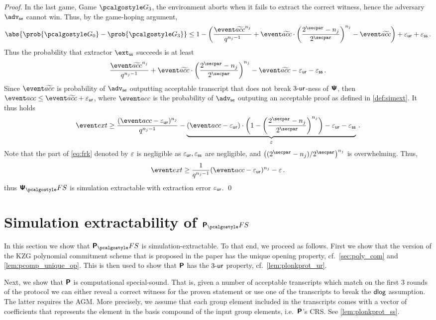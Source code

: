 \let\accentvec\vec \documentclass[runningheads,10pt]{llncs}
\begin{document}
\begin{proof}
	In the last game, Game $\game{3}$, the environment aborts when it fails to
	extract the correct witness, hence the adversary $\advse$ cannot win.  Thus,
	by the game-hoping argument, 
	\[
		\abs{\prob{\game{0}} - \prob{\game{3}}} \leq 1 -
		\left(\frac{\waccProb^{n_j}}{q^{n_j - 1}} + \waccProb \cdot
		\left(\frac{2^\secpar - n_j}{2^\secpar}\right)^{n_j} - \waccProb\right) + \epsur + \epsss\,.
	\]
	Thus the probability that extractor $\extss$ succeeds is at least
	\[
		\frac{\waccProb^{n_j}}{q^{n_j - 1}} + 
		\waccProb \cdot
		\left( \frac{2^\secpar - n_j}{2^\secpar}\right)^{n_j} -
	\waccProb - \epsur - \epsss\,.
	\]
	Since $\waccProb$ is probability of $\advse$ outputting acceptable
	transcript that does not break ${3\text{-}\mathsf{ur}}$-ness of $\bm{\mathsf{\Psi}}$, then $\accProb \leq
	\waccProb + \epsur$, where $\accProb$ is the probability of $\advse$ outputing an acceptable proof as defined in \cref{def:simext}. It thus holds
	\[
 		\label{eq:frk}
 		\extProb \geq \frac{(\accProb - \epsur)^{n_j}}{q^{n_j - 1}} -
		\underbrace{(\accProb - \epsur) \cdot \left( 1 -
			\left(\frac{2^\secpar - n_j}{2^\secpar}\right)^{n_j}\right)
- \epsur - \epsss}_{\eps}\,.
 	\]
 	Note that the part of \cref{eq:frk} denoted by $\varepsilon$ is negligible as
	$\varepsilon_{\mathsf{ur}}, \varepsilon_{\mathsf{ss}}$ are negligible, and $\left(\infrac{(2^\secpar
	- n_j)}{2^\secpar}\right)^{n_j}$ is overwhelming.
	Thus, 
 	\[
 		\extProb \geq \frac{1}{q^{n_j - 1}} (\accProb - \epsur)^{n_j} -\eps\,.
 	\] 
 	thus
 	$\psfs$ is simulation extractable with extraction error $\varepsilon_{\mathsf{ur}}$.
 	\qed
\end{proof}

\section{Simulation extractability of $\plonkprotfs$} 
In this section we show that $\plonkprotfs$
is simulation-extractable. To that end, we
proceed as follows. 
First we show that the version of the KZG polynomial commitment scheme that is
proposed in the \plonk{} paper has the unique opening property,
cf.~\cref{sec:poly_com} and \cref{lem:pcomp_unique_op}. This is then used to
show that $\bm{\mathsf{P}}$ has the ${3\text{-}\mathsf{ur}}$ property, cf.~\cref{lem:plonkprot_ur}.

Next, we show that 
$\bm{\mathsf{P}}$ is computational special-sound. That is, given a number of acceptable
transcripts which match on the first 3 rounds of the protocol we can either
reveal a correct witness for the proven statement or use one of the transcripts
to break the $\mathsf{dlog}$ assumption. The latter requires the AGM. More
precisely, we assume that each group element included in the
transcripts comes with a vector of coefficients that represents the element in
the basis compound of the input group elements, i.e.~$\bm{\mathsf{P}}$'s CRS. See \cref{lem:plonkprot_ss}.
\end{document}
